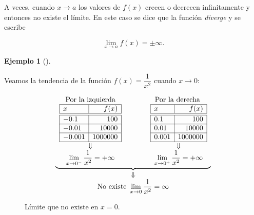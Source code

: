 \documentclass[
  a4paper,
]{scrreport}
\theoremstyle{plain}
\theoremstyle{plain}
\theoremstyle{definition}
\theoremstyle{definition}
\newtheorem{example}{Ejemplo}[chapter]
\theoremstyle{plain}
\theoremstyle{remark}
\begin{document}
A veces, cuando \(x\to a\) los valores de \(f(x)\) crecen o decrecen
infinitamente y entonces no existe el límite. En este caso se dice que
la función \emph{diverge} y se escribe

\[\lim_{x\to a}f(x)=\pm \infty.\]

\leavevmode{}%
\begin{example}[]\label{exm-limites-no-existen-3}

Veamos la tendencia de la función \(f(x)=\dfrac{1}{x^2}\) cuando
\(x\to 0\):

\[
\begin{array}{c}
\underbrace{\begin{array}{ccc}
\textrm{Por la izquierda} & \qquad & \textrm{Por la derecha }\\
\begin{array}{|l|r|}
\hline
x      & f(x)   \\
\hline\hline
 -0.1   & 100       \\
\hline
 -0.01   & 10000     \\
\hline
 -0.001  & 1000000   \\
\hline
\end{array}
& &
\begin{array}{|l|r|}
\hline
x      & f(x)   \\
\hline\hline
 0.1    & 100       \\
\hline
 0.01   & 10000    \\
\hline
 0.001  & 1000000   \\
\hline
\end{array}\\
\Downarrow & & \Downarrow\\
\displaystyle \lim_{x\to 0^-}\frac{1}{x^2}=+\infty
& &
\displaystyle \lim_{x\to 0^+}\frac{1}{x^2}=+\infty
\end{array}}\\
\Downarrow\\
\displaystyle \textrm{No existe }\lim_{x\to 0}\frac{1}{x^2}=\infty
\end{array}
\]

\begin{figure}

{\centering 



}

\caption{Límite que no existe en \(x=0\).}

\end{figure}

\end{example}
\end{document}
